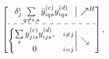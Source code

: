 \documentclass[useAMS,usenatbib]{mn2e}
\newcommand{\mat}[1]{{\bmath{#1}}}
\newcommand{\JJ}{\mat{J}} %
\newcommand{\MM}{\mat{M}}
\newcommand{\VV}{\mat{V}}
\newcommand{\GG}{\mat{G}}
\newcommand{\AUGx}[1]{\mathbf{\breve{#1}}}
\newcommand{\GGg}{\AUGx{G}}
\newcommand{\TOP}{\mathrm{U}}%
\newcommand{\Rop}[1]{\mathcal{R}_{{#1}}}
\newcommand{\Lop}[1]{\mathcal{L}_{{#1}}}
\numberwithin{equation}{section}
\providecommand{\DIFaddbegin}{} %
\providecommand{\DIFdelend}{} %
\begin{document}

\begin{equation}%
\DIFdelend \DIFaddbegin \JHJblocks{
  \delta^i_j \sum\limits_{q\ne i,s} \yycH_{iqs} \yyd_{iqs} 
}{
  \left \{ 
  \begin{array}{@{}cc@{}}
   \sum\limits_{s} \yyc_{jis} \yyd_{ijs},&{\scriptstyle i\ne j} \\
   0 &{\scriptstyle i=j}
  \end{array} \right . 
},
\label{eq:JHJ:DD:unpol}
\end{equation}
\end{document}
